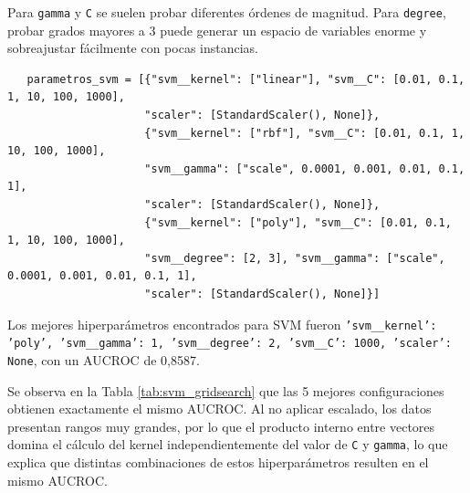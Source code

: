 \documentclass[10pt,a4paper]{article}
\begin{document}
Para \texttt{gamma} y \texttt{C} se suelen probar diferentes órdenes de magnitud. Para \texttt{degree}, probar grados mayores a 3 puede generar un espacio de variables enorme y sobreajustar fácilmente con pocas instancias.

\begin{lstlisting}
   parametros_svm = [{"svm__kernel": ["linear"], "svm__C": [0.01, 0.1, 1, 10, 100, 1000], 
                     "scaler": [StandardScaler(), None]},
                     {"svm__kernel": ["rbf"], "svm__C": [0.01, 0.1, 1, 10, 100, 1000], 
                     "svm__gamma": ["scale", 0.0001, 0.001, 0.01, 0.1, 1], 
                     "scaler": [StandardScaler(), None]},
                     {"svm__kernel": ["poly"], "svm__C": [0.01, 0.1, 1, 10, 100, 1000],
                     "svm__degree": [2, 3], "svm__gamma": ["scale", 0.0001, 0.001, 0.01, 0.1, 1], 
                     "scaler": [StandardScaler(), None]}]
\end{lstlisting}

Los mejores hiperparámetros encontrados para SVM fueron \texttt{'svm\_\_kernel': 'poly', 'svm\_\_gamma': 1, 'svm\_\_degree': 2, 'svm\_\_C': 1000, 'scaler': None}, con un AUCROC de 0,8587.

Se observa en la Tabla \ref{tab:svm_gridsearch} que las 5 mejores configuraciones obtienen exactamente el mismo AUCROC. Al no aplicar escalado, los datos presentan rangos muy grandes, por lo que el producto interno entre vectores domina el cálculo del kernel independientemente  del valor de \texttt{C} y \texttt{gamma}, lo que explica que distintas combinaciones de estos hiperparámetros resulten en el mismo AUCROC.
\end{document}
